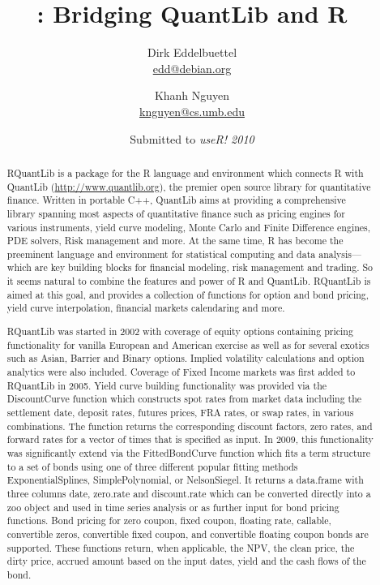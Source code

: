 \documentclass[11pt]{article}
\author{Dirk Eddelbuettel\\{\small \url{edd@debian.org}}
  \and Khanh Nguyen\\{\small \url{knguyen@cs.umb.edu}}}
\title{\pkg{RQuantLib}: Bridging QuantLib and R}
\date{Submitted to \textsl{useR! 2010}}
\newcommand{\proglang}[1]{\textsf{#1}}
\newcommand{\pkg}[1]{{\fontseries{b}\selectfont #1}}
\begin{document}
\maketitle
\thispagestyle{empty}
\begin{abstract}
  \addtolength{\parskip}{\baselineskip} 	%
  \noindent 								%
  \pkg{RQuantLib} is a package for the \proglang{R} language and environment
  which connects \proglang{R} with QuantLib (\url{http://www.quantlib.org}),
  the premier open source library for quantitative finance. Written in
  portable \proglang{C++}, QuantLib aims at providing a comprehensive library
  spanning most aspects of quantitative finance such as pricing engines for
  various instruments, yield curve modeling, Monte Carlo and Finite
  Difference engines, PDE solvers, Risk management and more. At the same
  time, \proglang{R} has become the preeminent language and environment for
  statistical computing and data analysis---which are key building blocks for
  financial modeling, risk management and trading. So it seems natural to
  combine the features and power of \proglang{R} and QuantLib.
  \pkg{RQuantLib} is aimed at this goal, and provides a collection of
  functions for option and bond pricing, yield curve interpolation, financial
  markets calendaring and more.

  \pkg{RQuantLib} was started in 2002 with coverage of equity options
  containing pricing functionality for vanilla European and American exercise
  as well as for several exotics such as Asian, Barrier and Binary options.
  Implied volatility calculations and option analytics were also included.
  Coverage of Fixed Income markets was first added to \pkg{RQuantLib} in
  2005. Yield curve building functionality was provided via the DiscountCurve
  function which constructs spot rates from market data including the
  settlement date, deposit rates, futures prices, FRA rates, or swap rates,
  in various combinations. The function returns the corresponding discount
  factors, zero rates, and forward rates for a vector of times that is
  specified as input. In 2009, this functionality was significantly extend
  via the FittedBondCurve function which fits a term structure to a set of
  bonds using one of three different popular fitting methods
  ExponentialSplines, SimplePolynomial, or NelsonSiegel.  It returns a
  data.frame with three columns date, zero.rate and discount.rate which can
  be converted directly into a \pkg{zoo} object and used in time series
  analysis or as further input for bond pricing functions. Bond pricing for
  zero coupon, fixed coupon, floating rate, callable, convertible zeros,
  convertible fixed coupon, and convertible floating coupon bonds are
  supported. These functions return, when applicable, the NPV, the clean
  price, the dirty price, accrued amount based on the input dates, yield and
  the cash flows of the bond.


\end{abstract}
\end{document}
